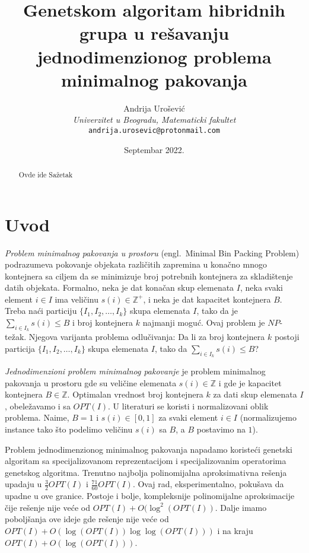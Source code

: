\documentclass[a4paper,12pt,twocolumn]{article}
\title{Genetskom algoritam hibridnih grupa u rešavanju jednodimenzionog problema minimalnog pakovanja}
\author{Andrija Urošević\\\textit{Univerzitet u Beogradu, Matematicki fakultet}\\\texttt{andrija.urosevic@protonmail.com}}
\date{Septembar 2022.}
\begin{document}
\maketitle

\begin{abstract}
    Ovde ide Sažetak
\end{abstract}

\section{Uvod}

\emph{Problem minimalnog pakovanja u prostoru} 
(engl.\ Minimal Bin Packing Problem) podrazumeva pokovanje objekata 
različitih zapremina u konačno mnogo kontejnera sa ciljem da se minimizuje
broj potrebnih kontejnera za skladištenje datih objekata. Formalno, neka je
dat konačan skup elemenata $I$, neka svaki element $i \in I$ ima veličinu 
$s(i) \in \mathbb{Z}^{+}$, i neka je dat kapacitet kontejnera $B$. Treba naći
particiju $\{I_1, I_2, \ldots, I_k\}$ skupa elemenata $I$, tako da je 
$\sum_{i \in I_k} s(i) \leq B$ i broj kontejnera $k$ najmanji moguć. 
Ovaj problem je $NP$-težak\cite{gj80}. Njegova varijanta problema odlučivanja:
Da li za broj kontejnera $k$ postoji particija $\{I_1, I_2, \ldots, I_k\}$
skupa elemenata $I$, tako da $\sum_{i \in I_k} s(i) \leq B$? 

\emph{Jednodimenzioni problem minimalnog pakovanje} je problem minimalnog 
pakovanja u prostoru gde su veličine elemenata $s(i) \in \mathbb{Z}$ i 
gde je kapacitet kontejnera $B \in \mathbb{Z}$. Optimalan vrednost broj 
kontejnera $k$ za dati skup elemenata $I$, obeležavamo i sa $OPT(I)$.
U literaturi se koristi i normalizovani oblik problema. Naime, $B = 1$ i
$s(i) \in [0, 1]$ za svaki element $i \in I$ (normalizujemo instance tako što
podelimo veličinu $s(i)$ sa $B$, a $B$ postavimo na $1$). 

Problem jednodimenzionog minimalnog pakovanja napadamo
koristeći genetski algoritam sa specijalizovanom reprezentacijom i 
specijalizovanim operatorima genetskog algoritma. Trenutno najbolja 
polinomijalna aproksimativna rešenja upadaju u $\frac{3}{2} OPT(I)$\cite{sl94} 
i $\frac{71}{60} OPT(I)$\cite{jg85, yz95}. Ovaj rad, eksperimentalno, pokušava 
da upadne u ove granice. Postoje i bolje, kompleksnije polinomijalne 
aproksimacije čije rešenje nije veće od 
$OPT(I) + O(\log^2 (OPT(I))$\cite{kk82}. Dalje imamo poboljšanja ove ideje
gde rešenje nije veće od
$OPT(I) + O(\log(OPT(I))\log\log(OPT(I)))$\cite{r13} i na kraju
$OPT(I) + O(\log(OPT(I)))$\cite{hr17}.
\end{document}

